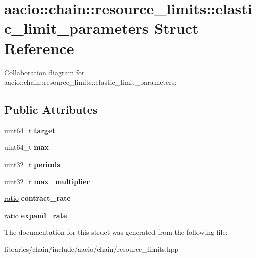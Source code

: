 \hypertarget{structaacio_1_1chain_1_1resource__limits_1_1elastic__limit__parameters}{}\section{aacio\+:\+:chain\+:\+:resource\+\_\+limits\+:\+:elastic\+\_\+limit\+\_\+parameters Struct Reference}
\label{structaacio_1_1chain_1_1resource__limits_1_1elastic__limit__parameters}


Collaboration diagram for aacio\+:\+:chain\+:\+:resource\+\_\+limits\+:\+:elastic\+\_\+limit\+\_\+parameters\+:
\subsection*{Public Attributes}
\begin{DoxyCompactItemize}
\item 
\mbox{\label{structaacio_1_1chain_1_1resource__limits_1_1elastic__limit__parameters_ababe0ae0fbd6276cc7b40601ce226363}} 
uint64\+\_\+t {\bfseries target}
\item 
\mbox{\label{structaacio_1_1chain_1_1resource__limits_1_1elastic__limit__parameters_a02f06c0f455c9d3bb9df864e2d425bba}} 
uint64\+\_\+t {\bfseries max}
\item 
\mbox{\label{structaacio_1_1chain_1_1resource__limits_1_1elastic__limit__parameters_aca94c05c959898822744a8a0d9cf597f}} 
uint32\+\_\+t {\bfseries periods}
\item 
\mbox{\label{structaacio_1_1chain_1_1resource__limits_1_1elastic__limit__parameters_a2e976dd0ac95b5d720914f2240bf9ccf}} 
uint32\+\_\+t {\bfseries max\+\_\+multiplier}
\item 
\mbox{\label{structaacio_1_1chain_1_1resource__limits_1_1elastic__limit__parameters_a7e5f5300259b2acaf48fc69c49129fb4}} 
\mbox{\hyperlink{structaacio_1_1chain_1_1resource__limits_1_1impl_1_1ratio}{ratio}} {\bfseries contract\+\_\+rate}
\item 
\mbox{\label{structaacio_1_1chain_1_1resource__limits_1_1elastic__limit__parameters_a0c5962fd633adb87af055ec1993eca22}} 
\mbox{\hyperlink{structaacio_1_1chain_1_1resource__limits_1_1impl_1_1ratio}{ratio}} {\bfseries expand\+\_\+rate}
\end{DoxyCompactItemize}


The documentation for this struct was generated from the following file\+:\begin{DoxyCompactItemize}
\item 
libraries/chain/include/aacio/chain/resource\+\_\+limits.\+hpp\end{DoxyCompactItemize}
